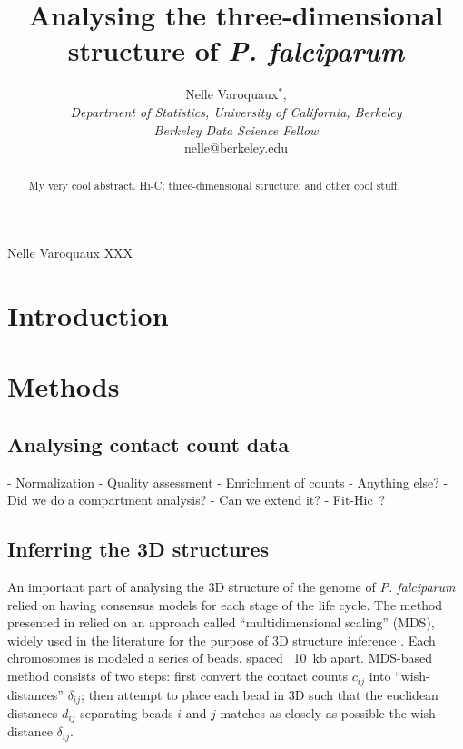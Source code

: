 \documentclass[oupdraft]{bio}
\begin{document}
\title{Analysing the three-dimensional structure of \em{P. falciparum}}

\author{Nelle Varoquaux$^\ast$,\\[4pt]
\textit{Department of Statistics, University of California, Berkeley \\
Berkeley Data Science Fellow}
\\[2pt]
{nelle@berkeley.edu}}

\markboth%
{Nelle Varoquaux}
{XXX}

\maketitle


\begin{abstract}
{My very cool abstract.}
{Hi-C; three-dimensional structure; and other cool stuff.
}
\end{abstract}


\section{Introduction}
\label{sec1}


\section{Methods}
\label{sec2}


\subsection{Analysing contact count data}

- Normalization
- Quality assessment
- Enrichment of counts
- Anything else?
    - Did we do a compartment analysis?
- Can we extend it?
  - Fit-Hic ?

\subsection{Inferring the 3D structures}

An important part of analysing the 3D structure of the genome of \textit{P.
falciparum} relied on having consensus models for each stage of the life
cycle. The method presented in \citet{ay:three-dimensional} relied on an
approach called ``multidimensional scaling'' (MDS), widely used in the
literature for the purpose of 3D structure inference
\citep{duan:three-dimensional, varoquaux:statistical, bau:, tanizawa:}. Each chromosomes is
modeled a series of beads, spaced ~10~kb apart. MDS-based method consists of
two steps: first convert the
contact counts $c_{ij}$ into ``wish-distances'' $\delta_{ij}$; then attempt
to place each bead in 3D such that the euclidean distances $d_{ij}$ separating
beads $i$ and $j$ matches as closely as possible the wish distance
$\delta_{ij}$.
\end{document}
